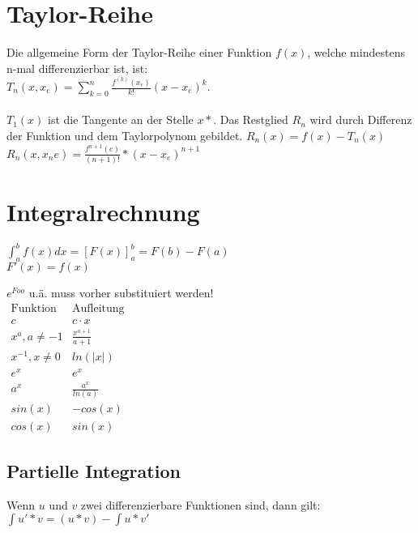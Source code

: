 \documentclass[a4paper,landscape, 11pt]{article}
\begin{document}
\begin{multicols}{5}
\begin{small}
                  
                  
                  
                  
                   	 
    \section{Taylor-Reihe}
        Die allgemeine Form der Taylor-Reihe einer Funktion $f(x)$, welche mindestens n-mal differenzierbar ist, ist: \\
        $T_n(x, x_e) = \sum_{k=0}^{n} \frac{f^{(k)}(x_e)}{k!}(x - x_e)^k$.
        \\ \\
        $T_1(x)$ ist die Tangente an der Stelle $x*$.
        Das Restglied $R_n$ wird durch Differenz der Funktion und dem Taylorpolynom gebildet. $R_n(x) = f(x) - T_n(x)$
        $R_n(x,x_ne) = \frac{f^{n+1}(c)}{(n+1)!}*(x-x_e)^{n+1} $
        
    \section{Integralrechnung}
    	$\int_a^b f(x)dx = [F(x)]_a^b = F(b) -F(a)$\\
    	$F'(x)=f(x)$
    	
    	
        $e^{Foo}$ u.ä. muss vorher substituiert werden!\\
        $\begin{matrix}
        \text{Funktion} & \text{Aufleitung} \\
        c & c \cdot x \\
        x^a, a \neq -1 & \frac{x^{a+1}}{a+1}\\
        x^{-1}, x \neq 0 & ln(|x|)\\
        e^x & e^x \\
        a^x & \frac{a^x}{ln(a)} \\
        sin(x) & -cos(x)\\
        cos(x) & sin(x)
        \end{matrix}$
        
        
        \subsection{Partielle Integration}
        Wenn $u$ und $v$ zwei differenzierbare Funktionen sind, dann gilt: \\
        $\int u' * v = (u * v) - \int u * v'$

\end{small}
\end{multicols}
\end{document}
